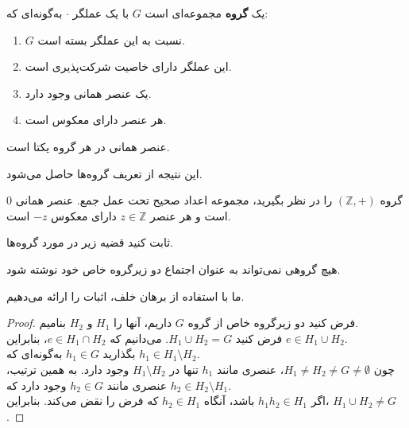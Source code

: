 \documentclass[persian]{KNED}
\begin{document}
\begin{definition}
یک \textbf{گروه} مجموعه‌ای است $G$ با یک عملگر $\cdot$ به‌گونه‌ای که:
\begin{enumerate}
    \item $G$ نسبت به این عملگر بسته است.
    \item این عملگر دارای خاصیت شرکت‌پذیری است.
    \item یک عنصر همانی وجود دارد.
    \item هر عنصر دارای معکوس است.
\end{enumerate}
\end{definition}

\begin{corollary}
عنصر همانی در هر گروه یکتا است.
\end{corollary}

\begin{remark}
این نتیجه از تعریف گروه‌ها حاصل می‌شود.
\end{remark}

\begin{example}
گروه $(\mathbb{Z}, +)$ را در نظر بگیرید، مجموعه اعداد صحیح تحت عمل جمع. عنصر همانی $0$ است و هر عنصر $z \in \mathbb{Z}$ دارای معکوس $-z$ است.
\end{example}


\begin{exercise}
ثابت کنید قضیه زیر در مورد گروه‌ها.
\begin{theorem}
هیچ گروهی نمی‌تواند به عنوان اجتماع دو زیرگروه خاص خود نوشته شود.
\end{theorem}

\end{exercise}

\begin{solution}
ما با استفاده از برهان خلف، اثبات را ارائه می‌دهیم.

\begin{proof}
فرض کنید دو زیرگروه خاص از گروه $G$ داریم، آنها را $H_1$ و $H_2$ بنامیم.\\ 
فرض کنید $H_1 \cup H_2 = G$. می‌دانیم که $e \in H_1 \cap H_2$، بنابراین $e \in H_1 \cup H_2$.\\
بگذارید $h_1 \in G$ به‌گونه‌ای که $h_1 \in H_1 \setminus H_2$.\\
چون $H_1 \neq H_2 \neq G \neq \emptyset$، عنصری مانند $h_1$ تنها در $H_1 \setminus H_2$ وجود دارد. به همین ترتیب، عنصری مانند $h_2 \in G$ وجود دارد که $h_2 \in H_2 \setminus H_1$.\\
اگر $h_1h_2 \in H_1$ باشد، آنگاه $h_2 \in H_1$ که فرض را نقض می‌کند. بنابراین، $H_1 \cup H_2 \neq G$.
\end{proof}

\end{solution}
\end{document}
